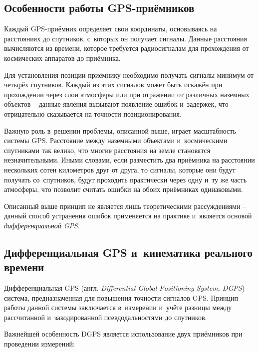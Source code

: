 
\subsection{Особенности работы GPS-приёмников}

Каждый GPS-приёмник определяет свои координаты, основываясь на расстояниях до спутников, с~которых он получает сигналы. Данные расстояния вычисляются из времени, которое требуется радиосигналам для прохождения от космических аппаратов до приёмника. \par

Для установления позиции приёмнику необходимо получать сигналы минимум от четырёх спутников. Каждый из этих сигналов может быть искажён при прохождении через слои атмосферы или при отражении от различных наземных объектов -- данные явления вызывают появление ошибок и~задержек, что отрицательно сказывается на точности позиционирования. \par

Важную роль в~решении проблемы, описанной выше, играет масштабность системы GPS. Расстояние между наземными объектами и~космическими спутниками так велико, что многие расстояния на земле становятся незначительными. Иными словами, если разместить два приёмника на расстоянии нескольких сотен километров друг от друга, то сигналы, которые они будут получать со~спутников, будут проходить практически через одну и~ту же часть атмосферы, что позволит считать ошибки на обоих приёмниках одинаковыми. \par

Описанный выше принцип не является лишь теоретическими рассуждениями -- данный способ устранения ошибок применяется на практике и~является основой \emph{дифференциальной GPS}.

\subsection{Дифференциальная GPS и~кинематика реального времени}

Дифференциальная GPS (англ. \emph{Differential Global Positioning System, DGPS}) -- система, предназначенная для повышения точности сигналов GPS. Принцип работы данной системы заключается в~измерении и~учёте разницы между рассчитанной и~закодированной псевдодальностями до спутников. \par

Важнейшей особенность DGPS является использование двух приёмников при проведении измерений:

